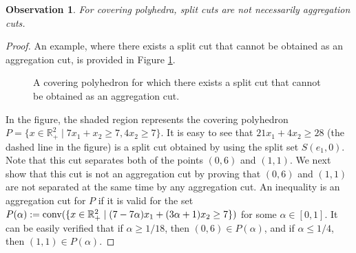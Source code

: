 \documentclass[11pt]{article}
\newcommand{\R}{\mathbb{R}}
\DeclareMathOperator{\conv}{conv}
\newtheorem{observation}{Observation}
\def\conv{\mathop{\rm conv}}
\begin{document}
\begin{appendix}
\begin{observation} 
\label{obs:CoveringSplitAgg}
For covering polyhedra, split cuts are not necessarily aggregation cuts.
\end{observation}
\begin{proof}
An example, where there exists a split cut that cannot be obtained as an aggregation cut, is provided in Figure \ref{fig:CoveringSplitAgg}. 
\begin{figure}[h]
\centering
{}
\caption{A covering polyhedron for which there exists a split cut that cannot be obtained as an aggregation cut.}
\label{fig:CoveringSplitAgg}
\end{figure}
In the figure, the shaded region represents the covering polyhedron $P = \{ x \in \R_+^2   \mid 7 x_1 + x_2 \geq 7, 4 x_2 \geq 7\}$. It is easy to see that $21 x_1+4 x_2 \geq 28$ (the dashed line in the figure) is a split cut obtained by using the split set $S(e_1,0)$. Note that this cut separates both of the points $(0,6)$ and $(1,1)$. We next show that this cut is not an aggregation cut by proving that $(0,6)$ and $(1,1)$ are not separated at the same time by any aggregation cut. An inequality is an aggregation cut for $P$ if it is valid for the set $P(\alpha) := \conv ( \{ x\in \R_+^2 \mid (7-7\alpha) x_1 + (3 \alpha +1) x_2 \geq 7 \})$ for some $\alpha \in [0,1]$. It can be easily verified that if $\alpha \geq 1/18$, then $(0,6) \in P(\alpha)$, and if $\alpha \leq 1/4$, then $(1,1) \in P(\alpha)$.
\end{proof}
\end{appendix}
\end{document}
